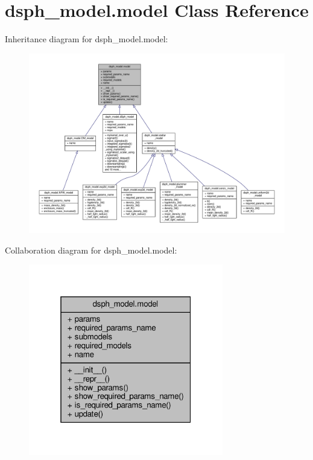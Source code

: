 \hypertarget{classdsph__model_1_1model}{}\section{dsph\+\_\+model.\+model Class Reference}
\label{classdsph__model_1_1model}


Inheritance diagram for dsph\+\_\+model.\+model\+:\nopagebreak
\begin{figure}[H]
\begin{center}
\leavevmode
\includegraphics[width=350pt]{d1/d46/classdsph__model_1_1model__inherit__graph}
\end{center}
\end{figure}


Collaboration diagram for dsph\+\_\+model.\+model\+:\nopagebreak
\begin{figure}[H]
\begin{center}
\leavevmode
\includegraphics[width=241pt]{d9/d48/classdsph__model_1_1model__coll__graph}
\end{center}
\end{figure}
